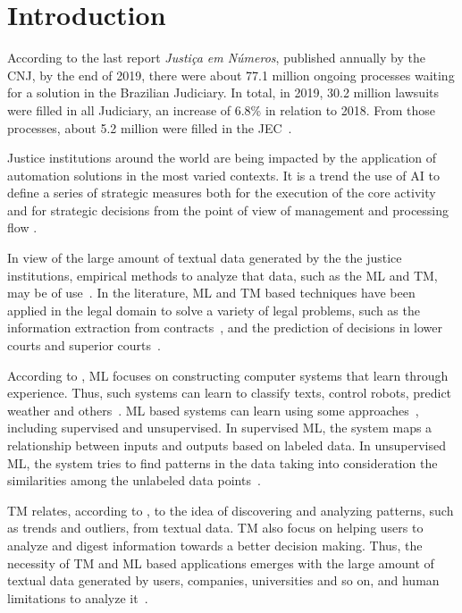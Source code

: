 \chapter{Introduction}

According to the last report \textit{Justiça em Números}, published annually by the \gls{CNJ}, by the end of 2019, there were about 77.1 million ongoing processes waiting for a solution in the Brazilian Judiciary. In total, in 2019, 30.2 million lawsuits were filled in all Judiciary, an increase of 6.8\% in relation to 2018. From those processes, about 5.2 million were filled in the \gls{JEC}~\cite{CNJ2020}. 


Justice institutions around the world are being impacted by the application of automation solutions in the most varied contexts. It is a trend the use of \gls{AI} to define a series of strategic measures both for the execution of the core activity and for strategic decisions from the point of view of management and processing flow \cite{Hartmann2019}. 

In view of  the large amount of textual data generated by the the justice institutions, empirical methods to analyze that data, such as the \gls{ML} and \gls{TM}, may be of use~\cite{Medvedeva2019, Weiss2010}.  In the literature, 
\gls{ML} and \gls{TM} based techniques have been applied in the legal domain to solve a variety of legal problems, such as the information extraction from contracts~\cite{Hassan2020}, and the prediction of decisions in lower courts and superior courts~\cite{Sulea2017, Virtucio2018}. 


According to \textcite{Mitchell1997}, \gls{ML} focuses on constructing computer systems that learn through experience. Thus, such systems can learn to classify texts, control robots, predict weather and others~\cite{Sebastiani2002, Kober2013, Shi2015}. \gls{ML} based systems can learn using some approaches~\cite{Schmidhuber2015, Caruana1997}, including supervised and unsupervised. In supervised \gls{ML}, the system maps a relationship between inputs and outputs based on labeled data. In unsupervised \gls{ML}, the system tries to find patterns in the data taking into consideration the similarities among the unlabeled data points~\cite{Theodoridis2009}.

\gls{TM} relates, according to \textcite{Aggarwal2013},  to the idea of discovering and analyzing patterns, such as trends and outliers, from textual data. \gls{TM} also focus on helping users to analyze and digest information towards a better decision making. Thus, the necessity of \gls{TM} and \gls{ML} based applications emerges with the large amount of textual data  generated by users, companies, universities and so on, and human limitations to analyze it~\cite{Lecun2015, Khan2014}. 

